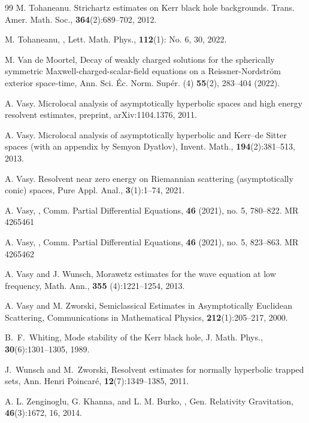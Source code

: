 \documentclass[10pt,a4paper,reqno]{amsart}
\theoremstyle{definition}
\theoremstyle{remark}
\numberwithin{equation}{section}
\begin{document}
\begin{thebibliography}{99}
 M. Tohaneanu.
\newblock Strichartz estimates on {K}err black hole backgrounds.
\newblock Trans. Amer. Math. Soc., \textbf{364}(2):689--702, 2012.

 M. Tohaneanu,
,
\newblock Lett. Math. Phys., \textbf{112}(1): No. 6, 30, 2022.

 M. Van de Moortel,
\newblock Decay of weakly charged solutions for the spherically symmetric Maxwell-charged-scalar-field equations on a Reissner-Nordström exterior space-time,
\newblock Ann. Sci. Éc. Norm. Supér. (4) \textbf{55}(2), 283–404 (2022). 

 A. Vasy. 
\newblock Microlocal analysis of asymptotically hyperbolic spaces and high energy resolvent estimates,
\newblock preprint, arXiv:1104.1376, 2011.


 A. Vasy.
\newblock Microlocal analysis of asymptotically hyperbolic and Kerr--de
  Sitter spaces (with an appendix by Semyon Dyatlov),
\newblock Invent. Math., \textbf{194}(2):381--513, 2013.

 A. Vasy.
\newblock Resolvent near zero energy on Riemannian scattering (asymptotically conic) spaces,
\newblock Pure Appl. Anal., \textbf{3}(1):1--74, 2021.

 A. Vasy,
,
\newblock Comm. Partial Differential Equations, \textbf{46} (2021), no. 5, 780--822. MR 4265461

 A. Vasy,
,
\newblock Comm. Partial Differential Equations, \textbf{46} (2021), no. 5, 823--863. MR 4265462

 A. Vasy and J. Wunsch,
\newblock Morawetz estimates for the wave equation at low frequency,
\newblock Math. Ann., \textbf{355} (4):1221--1254, 2013.

 A. Vasy and M. Zworski,
\newblock Semiclassical Estimates in Asymptotically Euclidean Scattering,
\newblock Communications in Mathematical Physics, \textbf{212}(1):205--217, 2000.

 B.~F.~Whiting,
\newblock Mode stability of the Kerr black hole,
\newblock J. Math. Phys., \textbf{30}(6):1301--1305, 1989.

 J.~Wunsch and M.~Zworski,
\newblock Resolvent estimates for normally hyperbolic trapped sets,
\newblock Ann. Henri Poincaré, \textbf{12}(7):1349--1385, 2011.

 A. L. Zenginoglu, G. Khanna, and L. M. Burko,
,
\newblock Gen. Relativity Gravitation, \textbf{46}(3):1672, 16, 2014.


\end{thebibliography}
\end{document}
